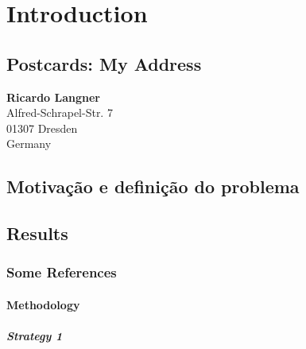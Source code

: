 %
\chapter{Introduction}
\label{sec:intro}


\Blindtext[2][2]

\section{Postcards: My Address}
\label{sec:intro:address}

\textbf{Ricardo Langner} \\
Alfred-Schrapel-Str. 7 \\
01307 Dresden \\
Germany


\section{Motivação e definição do problema}
\label{sec:intro:motivation}

\Blindtext[3][1] \cite{Jurgens:2000,Jurgens:1995,Miede:2011,Kohm:2011,Apple:keynote:2010,Apple:numbers:2010,Apple:pages:2010}

\section{Results}
\label{sec:intro:results}

\Blindtext[1][2]

\subsection{Some References}
\label{sec:intro:results:refs}

\cite{WEB:GNU:GPL:2010,WEB:Miede:2011}
\Blindtext[1][1]

\subsubsection{Methodology}
\label{sec:intro:results:refs:method}

\Blindtext[1][2]

\paragraph{Strategy 1}
\Blindtext[1][1]

